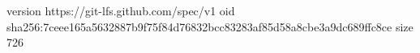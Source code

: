 version https://git-lfs.github.com/spec/v1
oid sha256:7ceee165a5632887b9f75f84d76832bcc83283af85d58a8cbe3a9dc689ffc8ce
size 726
